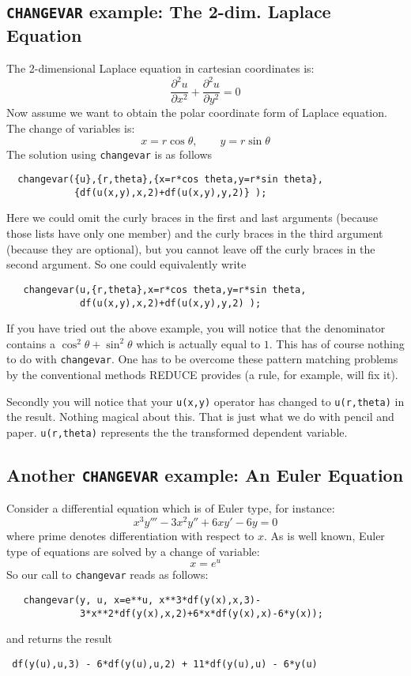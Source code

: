 \subsection{\texttt{CHANGEVAR} example: The 2-dim. Laplace Equation}
The 2-dimensional Laplace equation in cartesian coordinates is:
\[
   \frac{\partial^{2} u}{\partial x^{2}} +
   \frac{\partial^{2} u}{\partial y^{2}} = 0
\]
Now assume we want to obtain the polar coordinate form of Laplace equation.
The change of variables is:
\[
   x = r \cos \theta, \qquad  y = r \sin \theta
\]
The solution using \texttt{changevar} is as follows
\begin{verbatim}
  changevar({u},{r,theta},{x=r*cos theta,y=r*sin theta},
            {df(u(x,y),x,2)+df(u(x,y),y,2)} );
\end{verbatim}
Here we could omit the curly braces in the first and last arguments (because
those lists have only one member) and the curly braces in the third argument
(because they are optional), but you cannot leave off the curly braces in the
second argument. So one could equivalently write
\begin{verbatim}
   changevar(u,{r,theta},x=r*cos theta,y=r*sin theta,
             df(u(x,y),x,2)+df(u(x,y),y,2) );
\end{verbatim}
If you have tried out the above example, you will notice that the denominator
contains a $\cos^{2} \theta + \sin^{2} \theta$ which is actually equal to $1$.
This has of course nothing to do with \texttt{changevar}.
One has to be overcome these pattern matching problems by the
conventional methods REDUCE provides (a rule, for example,
will fix it).

Secondly you will notice that your \texttt{u(x,y)} operator has changed to
\texttt{u(r,theta)} in the result. Nothing magical  about this. That is just what
we do with pencil and paper. \texttt{u(r,theta)} represents the  the transformed
dependent variable.

\subsection{Another \texttt{CHANGEVAR} example: An Euler Equation}
Consider a differential equation which is of Euler type, for instance:
\[
   x^{3}y''' - 3 x^{2}y'' + 6 x y' - 6 y = 0
\]
where prime denotes differentiation with respect to $x$. As is well known,
Euler type of equations are solved by a change of variable:
\[
   x = e^{u}
\]
So our call to \texttt{changevar} reads as follows:
\begin{verbatim}
   changevar(y, u, x=e**u, x**3*df(y(x),x,3)-
             3*x**2*df(y(x),x,2)+6*x*df(y(x),x)-6*y(x));
\end{verbatim}
and returns the result
\begin{verbatim}
 df(y(u),u,3) - 6*df(y(u),u,2) + 11*df(y(u),u) - 6*y(u)
\end{verbatim}


